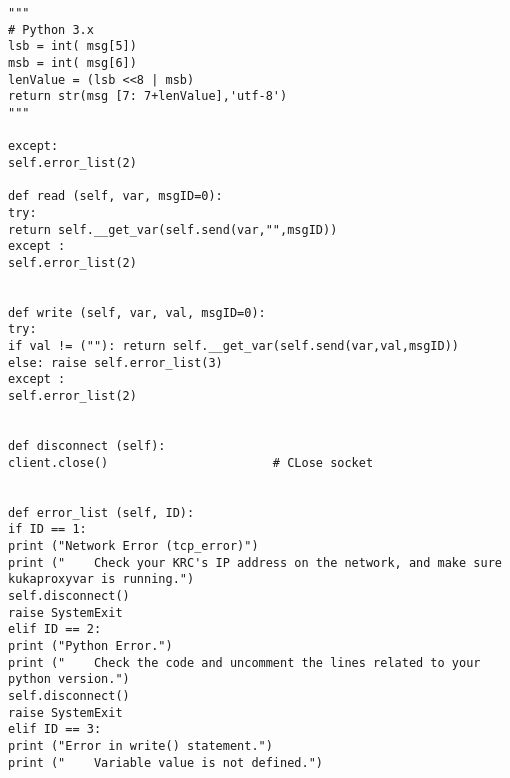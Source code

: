 \begin{lstlisting}[language=terCmd]
"""
# Python 3.x
lsb = int( msg[5])
msb = int( msg[6])
lenValue = (lsb <<8 | msb)
return str(msg [7: 7+lenValue],'utf-8')  
"""

except:
self.error_list(2)

def read (self, var, msgID=0):
try:
return self.__get_var(self.send(var,"",msgID))  
except :
self.error_list(2)


def write (self, var, val, msgID=0):
try:
if val != (""): return self.__get_var(self.send(var,val,msgID))
else: raise self.error_list(3)
except :
self.error_list(2)


def disconnect (self):
client.close()                       # CLose socket


def error_list (self, ID):
if ID == 1:
print ("Network Error (tcp_error)")
print ("    Check your KRC's IP address on the network, and make sure kukaproxyvar is running.")
self.disconnect()
raise SystemExit
elif ID == 2:
print ("Python Error.")
print ("    Check the code and uncomment the lines related to your python version.")
self.disconnect()
raise SystemExit
elif ID == 3:
print ("Error in write() statement.")
print ("    Variable value is not defined.")
\end{lstlisting}


\newpage
